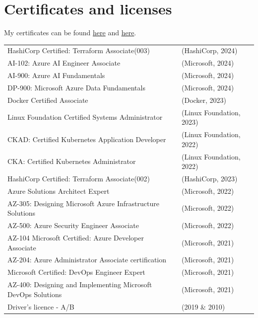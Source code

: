 \documentclass[a4paper,8pt]{article}
\begin{document}
\section{Certificates and licenses}
My certificates can be found \hyperlink{https://www.credly.com/users/casper-dijkstra/badges}{here} and \hyperlink{https://learn.microsoft.com/en-us/users/casperdijkstra-0464/transcript/v2n6nap36zq90xk?tab=credentials-tab}{here}.

\begin{tabular}{l l}
HashiCorp Certified: Terraform Associate(003) & (HashiCorp, 2024) \\
AI-102: Azure AI Engineer Associate & (Microsoft, 2024) \\
AI-900: Azure AI Fundamentals & (Microsoft, 2024) \\
DP-900: Microsoft Azure Data Fundamentals  &(Microsoft, 2024) \\
Docker Certified Associate & (Docker, 2023) \\
Linux Foundation Certified Systems Administrator & (Linux Foundation, 2023) \\
CKAD: Certified Kubernetes Application Developer & (Linux Foundation, 2022) \\
CKA: Certified Kubernetes Administrator & (Linux Foundation, 2022) \\
HashiCorp Certified: Terraform Associate(002) &(HashiCorp, 2023) \\
Azure Solutions Architect Expert & (Microsoft, 2022) \\
AZ-305: Designing Microsoft Azure Infrastructure Solutions & (Microsoft, 2022) \\
AZ-500: Azure Security Engineer Associate & (Microsoft, 2022) \\
AZ-104 Microsoft Certified: Azure Developer Associate & (Microsoft, 2021) \\
AZ-204: Azure Administrator Associate certification & (Microsoft, 2021) \\
Microsoft Certified: DevOps Engineer Expert & (Microsoft, 2021) \\
AZ-400: Designing and Implementing Microsoft DevOps Solutions & (Microsoft, 2021) \\
    Driver's licence - A/B & (2019 \& 2010)
\end{tabular}

\end{document}
